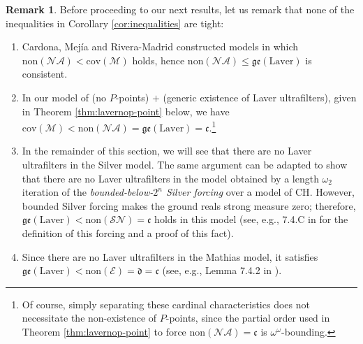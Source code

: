 \documentclass[12pt]{article}
\theoremstyle{definition}
\newtheorem*{rmk*}{\sc Remark}
\begin{document}
\begin{rmk*}
Before proceeding to our next results, let us remark that none of the inequalities in Corollary \ref{cor:inequalities} are tight:
\begin{enumerate}[label=(\roman*)]
    \item  Cardona, Mej\'ia and Rivera-Madrid \cite[Theorem D and Theorem E)]{CARDONA_MEJÍA_RIVERA-MADRID_2025} constructed models in which $\text{non}(\mathcal{NA})<\text{cov}(\mathcal{M})$ holds, hence $\text{non}(\mathcal{NA})\leq\mathfrak{ge}(\text{Laver})$ is consistent.
    \item In our model of (no $P$-points) $+$ (generic existence of Laver ultrafilters), given in Theorem \ref{thm:lavernop-point} below, we have $\text{cov}(\mathcal{M})<\text{non}(\mathcal{NA})=\mathfrak{ge}(\text{Laver})=\mathfrak{c}$.\footnote{Of course, simply separating these cardinal characteristics does not necessitate the non-existence of $P$-points, since the partial order used in Theorem \ref{thm:lavernop-point} to force $\text{non}(\mathcal{NA})=\mathfrak{c}$ is $\omega^\omega$-bounding.}
    \item In the remainder of this section, we will see that there are no Laver ultrafilters in the Silver model. The same argument can be adapted to show that there are no Laver ultrafilters in the model obtained by a length $\omega_2$ iteration of the \emph{bounded-below-$2^n$ Silver forcing} over a model of \textsf{CH}. However, bounded Silver forcing makes the ground reals strong measure zero; therefore, $\mathfrak{ge}(\text{Laver})<\text{non}(\mathcal{SN})=\mathfrak{c}$ holds in this model (see, e.g., 7.4.C in \cite{bj95} for the definition of this forcing and a proof of this fact).
    \item Since there are no Laver ultrafilters in the Mathias model, it satisfies $\mathfrak{ge}(\text{Laver})<\text{non}(\mathcal{E})=\mathfrak{d}=\mathfrak{c}$ (see, e.g., Lemma 7.4.2 in \cite{bj95}).
\end{enumerate}
\end{rmk*}
\end{document}

